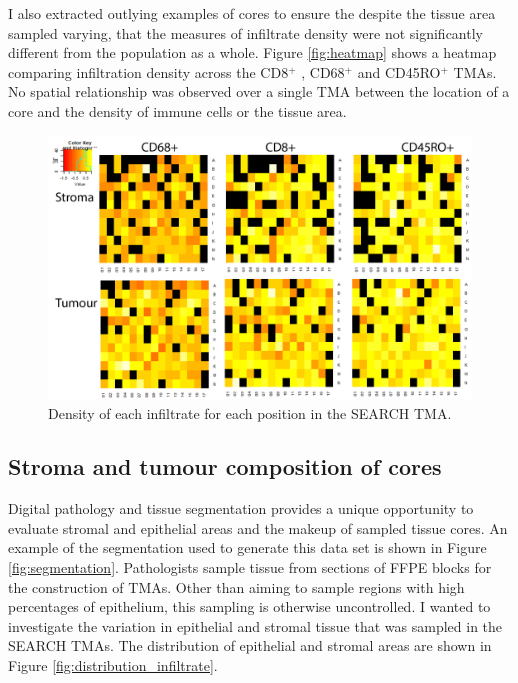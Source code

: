 I also extracted outlying examples of cores to ensure the despite the tissue area sampled varying, that the measures of infiltrate density were not significantly different from the population as a whole. Figure \ref{fig:heatmap} shows a heatmap comparing infiltration density across the CD8$^+$ , CD68$^+$ and CD45RO$^+$ TMAs. No spatial relationship was observed over a single TMA between the location of a core and the density of immune cells or the tissue area. 



\begin{figure}
    \centering
    \includegraphics{Chapter2/Figs/Raster/Thesis-heatmap.png}
    \caption{Density of each infiltrate for each position in the SEARCH TMA.}
    \label{fig:outlying_core}
\end{figure}


\subsection{Stroma and tumour composition of cores}
Digital pathology and tissue segmentation provides a unique opportunity to evaluate stromal and epithelial areas and the makeup of sampled tissue cores. An example of the segmentation used to generate this data set is shown in Figure \ref{fig:segmentation}.  Pathologists sample tissue from sections of FFPE blocks for the construction of TMAs. Other than aiming to sample regions with high percentages of epithelium, this sampling is otherwise uncontrolled. I wanted to investigate the variation in epithelial and stromal tissue that was sampled in the SEARCH TMAs. The distribution of epithelial and stromal areas are shown in Figure \ref{fig:distribution_infiltrate}. \\

